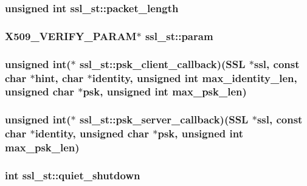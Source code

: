 \hypertarget{structssl__st_ae52697ae4cfec851e2b0d2c5ccaa1df7}{
\subsubsection[{packet\-\_\-length}]{\setlength{\rightskip}{0pt plus 5cm}unsigned int ssl\-\_\-st\-::packet\-\_\-length}}\label{structssl__st_ae52697ae4cfec851e2b0d2c5ccaa1df7}
\hypertarget{structssl__st_a384d0d3915209d3d4c8144146bab78aa}{
\subsubsection[{param}]{\setlength{\rightskip}{0pt plus 5cm}X509\-\_\-\-V\-E\-R\-I\-F\-Y\-\_\-\-P\-A\-R\-A\-M$\ast$ ssl\-\_\-st\-::param}}\label{structssl__st_a384d0d3915209d3d4c8144146bab78aa}
\hypertarget{structssl__st_ad72e738d0c860b10862bf13009023730}{
\subsubsection[{psk\-\_\-client\-\_\-callback}]{\setlength{\rightskip}{0pt plus 5cm}unsigned int($\ast$ ssl\-\_\-st\-::psk\-\_\-client\-\_\-callback)(S\-S\-L $\ast$ssl, const char $\ast$hint, char $\ast$identity, unsigned int max\-\_\-identity\-\_\-len, unsigned char $\ast$psk, unsigned int max\-\_\-psk\-\_\-len)}}\label{structssl__st_ad72e738d0c860b10862bf13009023730}
\hypertarget{structssl__st_afe72ae2f53bc658c0be204155759789d}{
\subsubsection[{psk\-\_\-server\-\_\-callback}]{\setlength{\rightskip}{0pt plus 5cm}unsigned int($\ast$ ssl\-\_\-st\-::psk\-\_\-server\-\_\-callback)(S\-S\-L $\ast$ssl, const char $\ast$identity, unsigned char $\ast$psk, unsigned int max\-\_\-psk\-\_\-len)}}\label{structssl__st_afe72ae2f53bc658c0be204155759789d}
\hypertarget{structssl__st_a3e921ca488cd9eec6ad4065ef627395a}{
\subsubsection[{quiet\-\_\-shutdown}]{\setlength{\rightskip}{0pt plus 5cm}int ssl\-\_\-st\-::quiet\-\_\-shutdown}}\label{structssl__st_a3e921ca488cd9eec6ad4065ef627395a}
